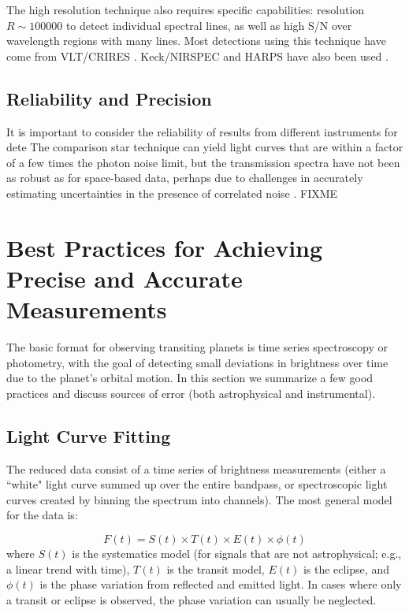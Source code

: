 \documentclass[graybox,natbib,nosecnum]{svmult}
\begin{document}
The high resolution technique also requires specific capabilities: resolution $R\sim100000$ to detect individual spectral lines, as well as high S/N over wavelength regions with many lines. Most detections using this technique have come from VLT/CRIRES \citep[e.g.][]{snellen10}.  Keck/NIRSPEC and HARPS have also been used \citep{lockwood14, martins15}.  
\subsection{Reliability and Precision}
It is important to consider the reliability of results from different instruments for dete 
The comparison star technique can yield light curves that are within a factor of a few times the photon noise limit, but the transmission spectra have not been as robust as for space-based data, perhaps due to challenges in accurately estimating uncertainties in the presence of correlated noise \citep[e.g.][]{}.  FIXME

\section{Best Practices for Achieving Precise and Accurate Measurements}
The basic format for observing transiting planets is time series spectroscopy or photometry, with the goal of detecting small deviations in brightness over time due to the planet's orbital motion.  In this section we summarize a few good practices and discuss sources of error (both astrophysical and instrumental).

\subsection{Light Curve Fitting} 
The reduced data consist of a time series of brightness measurements (either a ``white" light curve summed up over the entire bandpass, or spectroscopic light curves created by binning the spectrum into channels).  The most general model for the data is:

\begin{equation}
F(t) = S(t) \times T(t) \times E(t) \times \phi(t)
\end{equation}
where $S(t)$ is the systematics model (for signals that are not astrophysical; e.g., a linear trend with time), $T(t)$ is the transit model, $E(t)$ is the eclipse, and $\phi(t)$ is the phase variation from reflected and emitted light. In cases where only a transit or eclipse is observed, the phase variation can usually be neglected.
\end{document}
